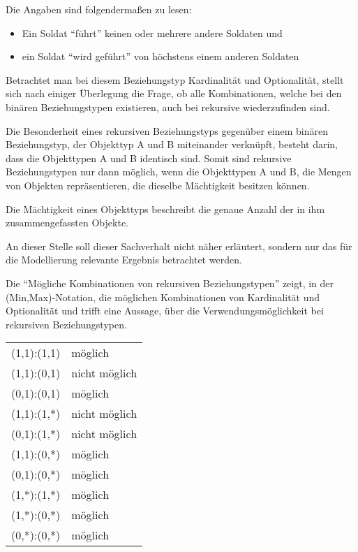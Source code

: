         Die Angaben sind folgenderma\ss en zu lesen:
        \begin{itemize}
          \item Ein Soldat \enquote{f\"uhrt} keinen oder mehrere andere Soldaten und
          \item ein Soldat \enquote{wird gef\"uhrt} von h\"ochstens einem anderen Soldaten
        \end{itemize}
        Betrachtet man bei diesem Beziehungstyp Kardinalit\"at und Optionalit\"at, stellt sich nach einiger \"Uberlegung die Frage, ob alle Kombinationen, welche bei den bin\"aren Beziehungstypen existieren, auch bei rekursive wiederzufinden sind.

        Die Besonderheit eines rekursiven Beziehungstyps gegen\"uber einem bin\"aren Beziehungstyp, der Objekttyp A und B miteinander verkn\"upft, besteht darin, dass die Objekttypen A und B identisch sind. Somit sind rekursive Beziehungstypen nur dann m\"oglich, wenn die Objekttypen A und B, die Mengen von Objekten repr\"asentieren, die dieselbe M\"achtigkeit besitzen k\"onnen.
\clearpage
        \begin{merke}
          Die M\"achtigkeit eines Objekttyps beschreibt die genaue Anzahl der in ihm zusammengefassten Objekte.
        \end{merke}
        An dieser Stelle soll dieser Sachverhalt nicht n\"aher erl\"autert, sondern nur das f\"ur die Modellierung relevante Ergebnis betrachtet werden.

        Die  \enquote{M\"ogliche Kombinationen von rekursiven Beziehungstypen} zeigt, in der\\ (Min,Max)-Notation, die m\"oglichen Kombinationen von Kardinalit\"at und Optionalit\"at und trifft eine Aussage, \"uber die Verwendungsm\"oglichkeit bei rekursiven Beziehungstypen.

        \label{combinationsrecurisverelationtyps}
        \begin{supertabular}[h]{lp{5cm}}
          (1,1):(1,1) & m\"oglich\\
          (1,1):(0,1) & nicht m\"oglich\\
          (0,1):(0,1) & m\"oglich\\
          (1,1):(1,*) & nicht m\"oglich\\
          (0,1):(1,*) & nicht m\"oglich\\
          (1,1):(0,*) & m\"oglich\\
          (0,1):(0,*) & m\"oglich\\
          (1,*):(1,*) & m\"oglich\\
          (1,*):(0,*) & m\"oglich\\
          (0,*):(0,*) & m\"oglich\\
        \end{supertabular}

